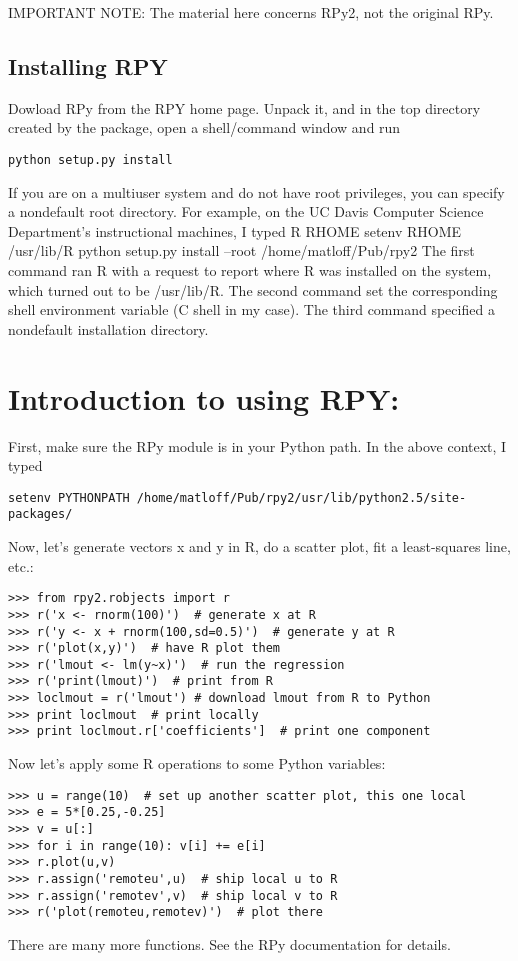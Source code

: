\documentclass[a4paper,12pt]{article}
\begin{document}
IMPORTANT NOTE: The material here concerns RPy2, not the original RPy.

\subsection{Installing RPY}


Dowload RPy from the RPY home page. Unpack it, and in the top directory created by the package, open a shell/command window and run
\begin{verbatim}
python setup.py install
\end{verbatim}

If you are on a multiuser system and do not have root privileges, you can specify a nondefault root directory. For example, on the UC Davis Computer Science Department's instructional machines, I typed
R RHOME
setenv RHOME /usr/lib/R
python setup.py install --root /home/matloff/Pub/rpy2
The first command ran R with a request to report where R was installed on the system, which turned out to be /usr/lib/R. The second command set the corresponding shell environment variable (C shell in my case). The third command specified a nondefault installation directory.

\section{Introduction to using RPY:}

First, make sure the RPy module is in your Python path. In the above context, I typed
\begin{verbatim}
setenv PYTHONPATH /home/matloff/Pub/rpy2/usr/lib/python2.5/site-packages/
\end{verbatim}
Now, let's generate vectors x and y in R, do a scatter plot, fit a least-squares line, etc.:

\begin{verbatim}
>>> from rpy2.robjects import r
>>> r('x <- rnorm(100)')  # generate x at R
>>> r('y <- x + rnorm(100,sd=0.5)')  # generate y at R
>>> r('plot(x,y)')  # have R plot them
>>> r('lmout <- lm(y~x)')  # run the regression
>>> r('print(lmout)')  # print from R
>>> loclmout = r('lmout') # download lmout from R to Python
>>> print loclmout  # print locally
>>> print loclmout.r['coefficients']  # print one component
\end{verbatim}
Now let's apply some R operations to some Python variables:

\begin{verbatim}
>>> u = range(10)  # set up another scatter plot, this one local
>>> e = 5*[0.25,-0.25]
>>> v = u[:]
>>> for i in range(10): v[i] += e[i]
>>> r.plot(u,v)
>>> r.assign('remoteu',u)  # ship local u to R
>>> r.assign('remotev',v)  # ship local v to R
>>> r('plot(remoteu,remotev)')  # plot there
\end{verbatim}
There are many more functions. See the RPy documentation for details.
\end{document}
